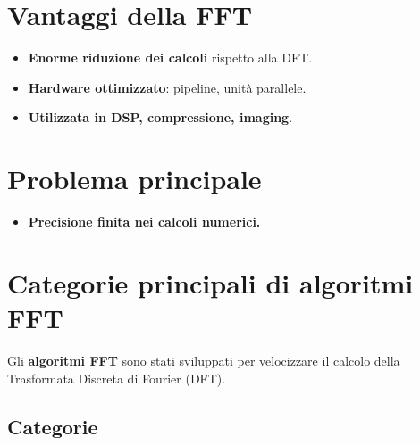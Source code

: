 \section*{Vantaggi della FFT}

\begin{itemize}
    \item \textbf{Enorme riduzione dei calcoli} rispetto alla DFT.
    \item \textbf{Hardware ottimizzato}: pipeline, unità parallele.
    \item \textbf{Utilizzata in DSP, compressione, imaging}.
\end{itemize}

\section*{Problema principale}

\begin{itemize}
    \item \textbf{Precisione finita nei calcoli numerici.}
\end{itemize}

\section*{Categorie principali di algoritmi FFT}

Gli \textbf{algoritmi FFT} sono stati sviluppati per velocizzare il calcolo della Trasformata Discreta di Fourier (DFT).

\subsection*{Categorie}

